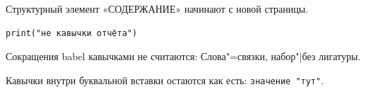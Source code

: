 Структурный элемент «СОДЕРЖАНИЕ» начинают с новой страницы.

\begin{lstlisting}
print("не кавычки отчёта")
\end{lstlisting}

Сокращения babel кавычками не считаются: Слова"=связки, набор"|без лигатуры.

Кавычки внутри буквальной вставки остаются как есть: \verb+значение "тут"+.
